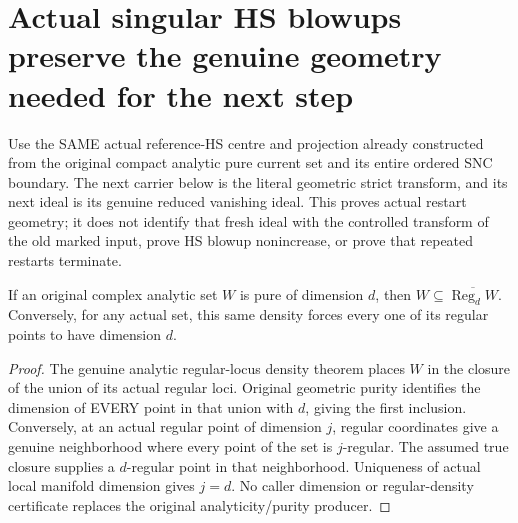 \section{Actual singular HS blowups preserve the genuine geometry needed for the next step}

Use the SAME actual reference-HS centre and projection already constructed from
the original compact analytic pure current set and its entire ordered SNC boundary.
The next carrier below is the literal geometric strict transform, and its next ideal
is its genuine reduced vanishing ideal. This proves actual restart geometry;
it does not identify that fresh ideal with the controlled transform of the old
marked input, prove HS blowup nonincrease, or prove that repeated restarts terminate.

\begin{lemma}
\label{hir:actual-current-purity-regular-density-dictionary}
\leanok
If an original complex analytic set $W$ is pure of dimension $d$, then
$W\subseteq\overline{\operatorname{Reg}_dW}$. Conversely, for any actual set,
this same density forces every one of its regular points to have dimension $d$.
\end{lemma}
\begin{proof}
The genuine analytic regular-locus density theorem places $W$ in the closure
of the union of its actual regular loci. Original geometric purity identifies
the dimension of EVERY point in that union with $d$, giving the first inclusion.
Conversely, at an actual regular point of dimension $j$, regular coordinates
give a genuine neighborhood where every point of the set is $j$-regular.
The assumed true closure supplies a $d$-regular point in that neighborhood.
Uniqueness of actual local manifold dimension gives $j=d$. No caller dimension
or regular-density certificate replaces the original analyticity/purity producer.
\end{proof}

